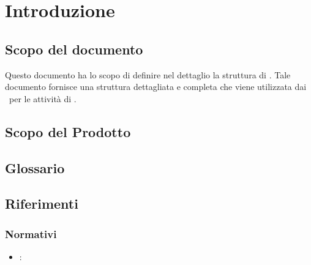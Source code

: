 \newpage
\section{Introduzione}
\subsection{Scopo del documento}
Questo documento ha lo scopo di definire nel dettaglio la struttura di \capitolato. Tale documento fornisce una struttura dettagliata e completa che viene utilizzata dai \ProgrP\ per le attività di .
\subsection{Scopo del Prodotto}
\scopoProdotto

\subsection{Glossario}
\descrizioneGlossario

\subsection{Riferimenti}
\subsubsection{Normativi}
\riferimentiNormativi
\begin{itemize}
\item \textbf{\AdR}: \analisiDeiRequisiti
\end{itemize}

